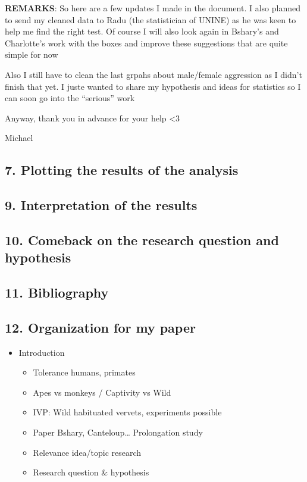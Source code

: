 \documentclass[
]{article}
\providecommand{\tightlist}{%
  \setlength{\itemsep}{0pt}\setlength{\parskip}{0pt}}
\begin{document}
\textbf{REMARKS}: So here are a few updates I made in the document. I
also planned to send my cleaned data to Radu (the statistician of UNINE)
as he was keen to help me find the right test. Of course I will also
look again in Bshary's and Charlotte's work with the boxes and improve
these suggestions that are quite simple for now

Also I still have to clean the last grpahs about male/female aggression
as I didn't finish that yet. I juste wanted to share my hypothesis and
ideas for statistics so I can soon go into the ``serious'' work

Anyway, thank you in advance for your help \textless3

Michael

\hypertarget{plotting-the-results-of-the-analysis}{%
\subsection{7. Plotting the results of the
analysis}\label{plotting-the-results-of-the-analysis}}

\hypertarget{interpretation-of-the-results}{%
\subsection{9. Interpretation of the
results}\label{interpretation-of-the-results}}

\hypertarget{comeback-on-the-research-question-and-hypothesis}{%
\subsection{10. Comeback on the research question and
hypothesis}\label{comeback-on-the-research-question-and-hypothesis}}

\hypertarget{bibliography}{%
\subsection{11. Bibliography}\label{bibliography}}

\hypertarget{organization-for-my-paper}{%
\subsection{12. Organization for my
paper}\label{organization-for-my-paper}}

\begin{itemize}
\tightlist
\item
  Introduction

  \begin{itemize}
  \tightlist
  \item
    Tolerance humans, primates
  \item
    Apes vs monkeys / Captivity vs Wild
  \item
    IVP: Wild habituated vervets, experiments possible
  \item
    Paper Bshary, Canteloup\ldots{} Prolongation study
  \item
    Relevance idea/topic research
  \item
    Research question \& hypothesis
  \end{itemize}
\end{itemize}
\end{document}
